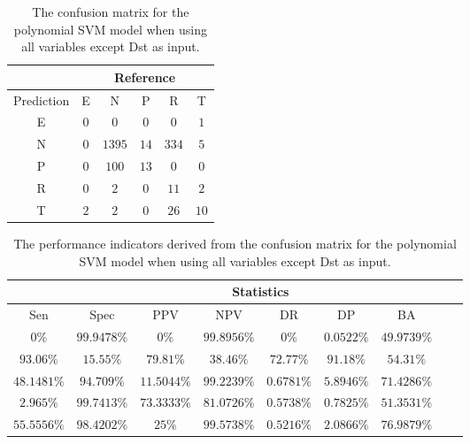 \begin{table}[!ht]
	\centering
	\begin{tabular}{|c|c|c|c|c|c|}
		\hline
		 & \multicolumn{5}{|c|}{Reference} \\ \hline
		 Prediction & E & N & P & R & T \\ \hline
		 E & $0$ & $0$ & $0$ & $0$ & $1$ \\ \hline
		 N & $0$ & $1395$ & $14$ & $334$ & $5$ \\ \hline
		 P & $0$ & $100$ & $13$ & $0$ & $0$ \\ \hline
		 R & $0$ & $2$ & $0$ & $11$ & $2$ \\ \hline
		 T & $2$ & $2$ & $0$ & $26$ & $10$ \\ \hline
	\end{tabular}
	\caption{The confusion matrix for the polynomial SVM model when using all variables except Dst as input.}
	\label{tab:cm:noDst:svmPoly}
\end{table}

\begin{table}[!ht]
	\centering
	\begin{tabular}{|c|c|c|c|c|c|c|c|c|}
		\hline
		 & \multicolumn{7}{c|}{Statistics} \\ \hline
		Sen & Spec & PPV & NPV & DR & DP & BA \\ \hline
		$0\%$ & $99.9478\%$ & $0\%$ & $99.8956\%$ & $0\%$ & $0.0522\%$ & $49.9739\%$ \\ \hline
		$93.06\%$ & $15.55\%$ & $79.81\%$ & $38.46\%$ & $72.77\%$ & $91.18\%$ & $54.31\%$ \\ \hline
		$48.1481\%$ & $94.709\%$ & $11.5044\%$ & $99.2239\%$ & $0.6781\%$ & $5.8946\%$ & $71.4286\%$ \\ \hline
		$2.965\%$ & $99.7413\%$ & $73.3333\%$ & $81.0726\%$ & $0.5738\%$ & $0.7825\%$ & $51.3531\%$ \\ \hline
		$55.5556\%$ & $98.4202\%$ & $25\%$ & $99.5738\%$ & $0.5216\%$ & $2.0866\%$ & $76.9879\%$ \\ \hline
	\end{tabular}
	\caption{The performance indicators derived from the confusion matrix for the polynomial SVM model when using all variables except Dst as input.}
	\label{tab:cs:noDst:svmPoly}
\end{table}

